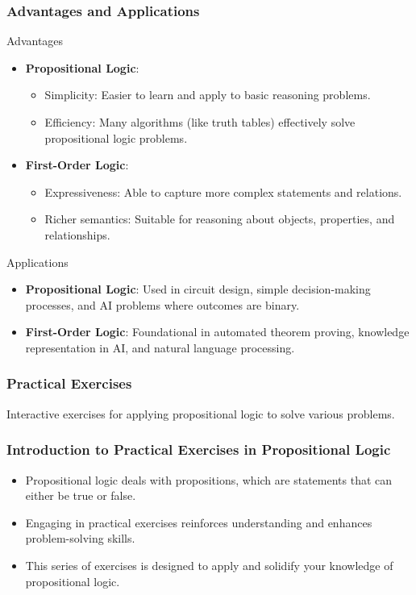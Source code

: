 \documentclass[aspectratio=169]{beamer}
\begin{document}
\begin{frame}[fragile]
  \frametitle{Advantages and Applications}
  \begin{block}{Advantages}
    \begin{itemize}
      \item \textbf{Propositional Logic}:
        \begin{itemize}
          \item Simplicity: Easier to learn and apply to basic reasoning problems.
          \item Efficiency: Many algorithms (like truth tables) effectively solve propositional logic problems.
        \end{itemize}
      \item \textbf{First-Order Logic}:
        \begin{itemize}
          \item Expressiveness: Able to capture more complex statements and relations.
          \item Richer semantics: Suitable for reasoning about objects, properties, and relationships.
        \end{itemize}
    \end{itemize}
  \end{block}
  
  \begin{block}{Applications}
    \begin{itemize}
      \item \textbf{Propositional Logic}: Used in circuit design, simple decision-making processes, and AI problems where outcomes are binary.
      \item \textbf{First-Order Logic}: Foundational in automated theorem proving, knowledge representation in AI, and natural language processing.
    \end{itemize}
  \end{block}
\end{frame}

\begin{frame}[fragile]
    \frametitle{Practical Exercises}
    Interactive exercises for applying propositional logic to solve various problems.
\end{frame}

\begin{frame}[fragile]
    \frametitle{Introduction to Practical Exercises in Propositional Logic}
    \begin{itemize}
        \item Propositional logic deals with propositions, which are statements that can either be true or false.
        \item Engaging in practical exercises reinforces understanding and enhances problem-solving skills.
        \item This series of exercises is designed to apply and solidify your knowledge of propositional logic.
    \end{itemize}
\end{frame}
\end{document}
